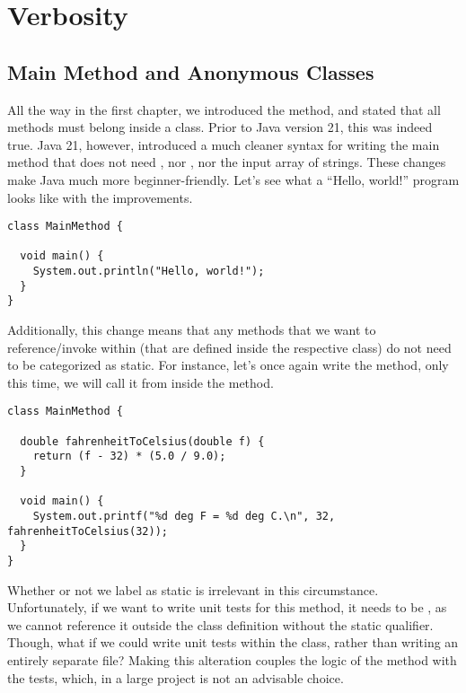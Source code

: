\section{Verbosity}

\subsection{Main Method and Anonymous Classes}
All the way in the first chapter, we introduced the  method, and stated that all methods must belong inside a class. Prior to Java version 21, this was indeed true. Java 21, however, introduced a much cleaner syntax for writing the main method that does not need , nor , nor the input array of strings. These changes make Java much more beginner-friendly. Let's see what a ``Hello, world!'' program looks like with the improvements.

\begin{lstlisting}[language=MyJava]
class MainMethod {
  
  void main() {
    System.out.println("Hello, world!");
  }
}
\end{lstlisting}

Additionally, this change means that any methods that we want to reference/invoke within  (that are defined inside the respective class) do not need to be categorized as static. For instance, let's once again write the  method, only this time, we will call it from inside the  method.

\begin{lstlisting}[language=MyJava]
class MainMethod {

  double fahrenheitToCelsius(double f) {
    return (f - 32) * (5.0 / 9.0);
  }
  
  void main() {
    System.out.printf("%d deg F = %d deg C.\n", 32, fahrenheitToCelsius(32));
  }
}
\end{lstlisting}

Whether or not we label  as static is irrelevant in this circumstance. Unfortunately, if we want to write unit tests for this method, it needs to be , as we cannot reference it outside the class definition without the static qualifier. Though, what if we could write unit tests within the  class, rather than writing an entirely separate file? Making this alteration couples the logic of the method with the tests, which, in a large project is not an advisable choice. 

